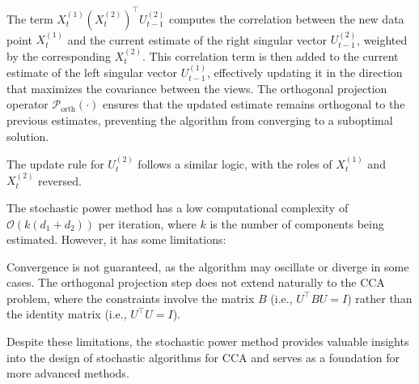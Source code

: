 The term $X_t^{(1)} (X_t^{(2)})^\top U^{(2)}_{t-1}$ computes the correlation between the new data point $X_t^{(1)}$ and the current estimate of the right singular vector $U^{(2)}_{t-1}$, weighted by the corresponding $X_t^{(2)}$.
This correlation term is then added to the current estimate of the left singular vector $U^{(1)}_{t-1}$, effectively updating it in the direction that maximizes the covariance between the views.
The orthogonal projection operator $\mathcal{P}_{\text{orth}}(\cdot)$ ensures that the updated estimate remains orthogonal to the previous estimates, preventing the algorithm from converging to a suboptimal solution.

The update rule for $U^{(2)}_t$ follows a similar logic, with the roles of $X_t^{(1)}$ and $X_t^{(2)}$ reversed.

The stochastic power method has a low computational complexity of $\mathcal{O}(k(d_1+ d_2))$ per iteration, where $k$ is the number of components being estimated. However, it has some limitations:

Convergence is not guaranteed, as the algorithm may oscillate or diverge in some cases.
The orthogonal projection step does not extend naturally to the CCA problem, where the constraints involve the matrix $B$ (i.e., $U^\top B U = I$) rather than the identity matrix (i.e., $U^\top U = I$).

Despite these limitations, the stochastic power method provides valuable insights into the design of stochastic algorithms for CCA and serves as a foundation for more advanced methods.
